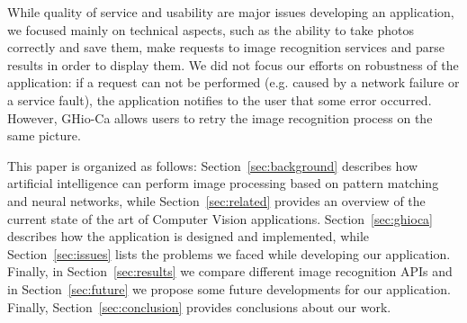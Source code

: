 While quality of service and usability are major issues developing an 
application, we focused mainly on technical aspects, such as the ability to 
take photos correctly and save them, make requests to image recognition 
services and parse results in order to display them. We did not focus our 
efforts on robustness of the application: if a request can not be performed 
(e.g. caused by a network failure or a service fault), the application notifies 
to the user that some error occurred. However, GHio-Ca allows users to retry the 
image recognition process on the same picture.

This paper is organized as follows: Section~\ref{sec:background} describes how 
artificial intelligence can perform image processing based on pattern matching 
and neural networks, while Section~\ref{sec:related} provides an overview of 
the current state of the art of Computer Vision applications. 
Section~\ref{sec:ghioca} describes how the application is designed and 
implemented, while Section~\ref{sec:issues} lists the problems we faced while 
developing our application. Finally, in Section~\ref{sec:results} we compare 
different image recognition APIs and in Section~\ref{sec:future} we propose some 
future developments for our application. Finally, Section~\ref{sec:conclusion} 
provides conclusions about our work.